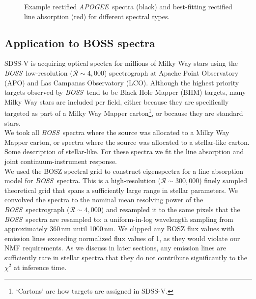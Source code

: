 \documentclass[modern]{aastex631}
\newcommand{\project}[1]{\textit{#1}}
\newcommand{\apogee}{\project{APOGEE}}
\newcommand{\boss}{\project{BOSS}}
\newcommand{\todo}[1]{\textcolor{tab:blue}{#1}}
\begin{document}
\begin{figure}
    \caption{Example rectified \apogee\ spectra (black) and best-fitting rectified line absorption (red) for different spectral types. \label{fig:example-apogee-spectra}}
\end{figure}


\subsection{Application to BOSS spectra}
\label{sec:}

SDSS-V is acquiring optical spectra for millions of Milky Way stars using the \boss\ 
low-resolution ($\mathcal{R} \sim 4{,}000$) spectrograph at Apache Point Observatory (APO) and Las Campanas Observatory (LCO). Although the highest priority targets observed by \boss\ tend to be Black Hole Mapper (BHM) targets, many Milky Way stars are included per field, either because they are specifically targeted as part of a Milky Way Mapper carton\footnote{`Cartons' are how targets are assigned in SDSS-V.}, or because they are standard stars.\\

We took all \boss\ spectra where the source was allocated to a Milky Way Mapper carton, or spectra where the source was allocated to a stellar-like carton. \todo{Some description of stellar-like.} For these spectra we fit the line absorption and joint continuum-instrument response.\\

We used the BOSZ spectral grid to construct eigenspectra for a line absorption model for \boss\ spectra. This is a high-resolution ($\mathcal{R} \sim 300{,}000$) finely sampled theoretical grid that spans a sufficiently large range in stellar parameters. We convolved the spectra to the nominal mean resolving power of the \boss\ spectrograph ($\mathcal{R} \sim 4{,}000$) and resampled it to the same pixels that the \boss\ spectra are resampled to: a uniform-in-log wavelength sampling from approximately 360\,nm until \todo{1000\,nm}. We clipped any BOSZ flux values with emission lines exceeding normalized flux values of 1, as they would violate our NMF requirements. As we discuss in later sections, any emission lines are sufficiently rare in stellar spectra that they do not contribute significantly to the $\chi^2$ at inference time.\\
\end{document}
